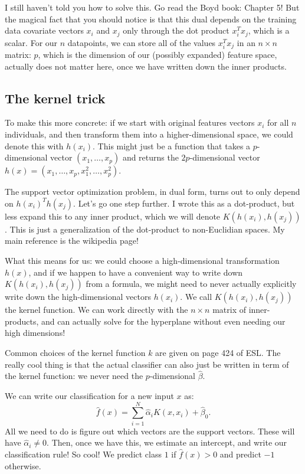 I still haven't told you how to solve this. Go read the Boyd book: Chapter 5! But the magical fact that you should notice is that this dual depends on the training data covariate vectors $x_i$ and $x_j$ only through the dot product $x_i^T x_j$, which is a scalar. For our $n$ datapoints, we can store all of the values $x_i^T x_j$ in an $n \times n$ matrix: $p$, which is the dimension of our (possibly expanded) feature space, actually does not matter here, once we have written down the inner products. 

\subsection{The kernel trick}

To make this more concrete: if we start with original features vectors $x_i$ for all $n$ individuals, and then transform them into a higher-dimensional space, we could denote this with $h(x_i)$. This might just be a function that takes a $p$-dimensional vector $(x_1,\ldots,x_p)$ and returns the $2p$-dimensional vector $h(x) = (x_1,\ldots,x_p, x_1^2,\ldots,x_p^2)$. 

The support vector optimization problem, in dual form, turns out to only depend on $h(x_i)^T h(x_j)$. Let's go one step further. I wrote this as a dot-product, but less expand this to any inner product, which we will denote $K(h(x_i), h(x_j))$. This is just a generalization of the dot-product to non-Euclidian spaces. My main reference is the wikipedia page!

What this means for us: we could choose a high-dimensional transformation $h(x)$, and if we happen to have a convenient way to write down $K(h(x_i), h(x_j))$ from a formula, we might need to never actually explicitly write down the high-dimensional vectors $h(x_i)$. We call $K(h(x_i), h(x_j))$ the kernel function. We can work directly with the $n \times n$ matrix of inner-products, and can actually solve for the hyperplane without even needing our high dimensions!

Common choices of the kernel function $k$ are given on page 424 of ESL. The really cool thing is that the actual classifier can also just be written in term of the kernel function: we never need the $p$-dimensional $\hat{\beta}$. 

We can write our classification for a new input $x$ as:
$$
\hat{f}(x) = \sum_{i=1}^N \hat{\alpha}_i K(x,x_i) + \hat{\beta}_0.
$$
All we need to do is figure out which vectors are the support vectors. These will have $\hat{\alpha}_i \neq 0$. Then, once we have this, we estimate an intercept, and write our classification rule! So cool! We predict class $1$ if $\hat{f}(x) > 0$ and predict $-1$ otherwise. 

